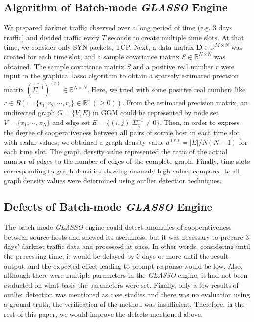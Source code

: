 \documentclass[conference]{IEEEtran}
\begin{document}
\subsection{Algorithm of Batch-mode {\it GLASSO} Engine}
We prepared darknet traffic observed over a long period of time (e.g. 3 days traffic) and divided traffic every $T$ seconds to create multiple time slots.
At that time, we consider only SYN packets, TCP.
Next, a data matrix $\bm{D}\in\mathbb{R}^{M \times N}$ was created for each time slot, and a sample covariance matrix $S\in\mathbb{R}^{N \times N}$ was obtained.
The sample covariance matrix $S$ and a positive real number $r$ were input to the graphical lasso algorithm to obtain a sparsely estimated precision matrix ${(\hat{\Sigma^{-1}})}^{(r)}\in\mathbb{R}^{N \times N}$.
Here, we tried with some positive real numbers like $r \in R ( = \{r_1, r_2, \cdots, r_s\}\in\mathbb{R}^s\;(\geq 0))$.
From the estimated precision matrix, an undirected graph $G = \{V, E\}$ in GGM could be represented by node set $V=\{x_{1}, \cdots, x_{N}\}$ and edge set $E=\{(i,j)|\Sigma^{-1}_{ij}\neq0\}$.
Then, in order to express the degree of cooperativeness between all pairs of source host in each time slot with scalar values, we obtained a graph density value $d^{(r)}=|E|/N(N-1)$ for each time slot.
The graph density value represented the ratio of the actual number of edges to the number of edges of the complete graph.
Finally, time slots corresponding to graph densities showing anomaly high values compared to all graph density values were determined using outlier detection techniques.




\subsection{Defects of Batch-mode {\it GLASSO} Engine}
The batch mode {\it GLASSO} engine could detect anomalies of cooperativeness between source hosts and showed its usefulness, but it was necessary to prepare 3 days' darknet traffic data and processed at once.
In other words, considering until the processing time, it would be delayed by 3 days or more until the result output, and the expected effect leading to prompt response would be low.
Also, although there were multiple parameters in the {\it GLASSO} engine, it had not been evaluated on what basis the parameters were set.
Finally, only a few results of outlier detection was mentioned as case studies and there was no evaluation using a ground truth; the verification of the method was insufficient.
Therefore, in the rest of this paper, we would improve the defects mentioned above.
\end{document}
